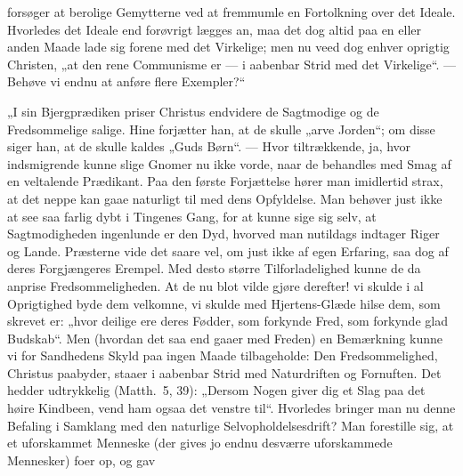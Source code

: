 \documentclass[12pt,a4paper]{book}
\begin{document}
forsøger at berolige Gemytterne ved at fremmumle en Fortolkning over det Ideale. Hvorledes
det Ideale end forøvrigt lægges an, maa det dog altid paa en eller anden Maade lade sig
forene med det Virkelige; men nu veed dog enhver oprigtig Christen, „at den rene
Communisme er --- i aabenbar Strid med det Virkelige“. --- Behøve vi endnu at anføre flere
Exempler?“

„I sin Bjergprædiken priser Christus endvidere de Sagtmodige og de Fredsommelige salige.
Hine forjætter han, at de skulle „arve Jorden“; om disse siger han, at de skulle kaldes
„Guds Børn“. --- Hvor tiltrækkende, ja, hvor indsmigrende kunne slige Gnomer nu ikke vorde,
naar de behandles med Smag af en veltalende Prædikant. Paa den første Forjættelse hører man
imidlertid strax, at det neppe kan gaae naturligt til med dens Opfyldelse. Man behøver just
ikke at see saa farlig dybt i Tingenes Gang, for at kunne sige sig selv, at Sagtmodigheden
ingenlunde er den Dyd, hvorved man nutildags indtager Riger og Lande. Præsterne vide det
saare vel, om just ikke af egen Erfaring, saa dog af deres Forgjængeres
Erempel. Med desto større Tilforladelighed kunne de da anprise Fredsommeligheden. At de nu
blot vilde gjøre derefter! vi skulde i al Oprigtighed byde dem velkomne, vi skulde med
Hjertens-Glæde hilse dem, som skrevet er: „hvor deilige ere deres Fødder, som forkynde
Fred, som forkynde glad Budskab“. Men (hvordan det saa end gaaer med Freden) en Bemærkning
kunne vi for Sandhedens Skyld paa ingen Maade
tilbageholde: Den Fredsommelighed, Christus paabyder, staaer i aabenbar Strid med
Naturdriften og Fornuften. Det hedder udtrykkelig (Matth.\ 5, 39): „Dersom Nogen giver dig
et Slag paa det høire Kindbeen, vend ham ogsaa det venstre til“. Hvorledes bringer man nu
denne Befaling i Samklang med den naturlige Selvopholdelsesdrift? Man forestille sig, at et
uforskammet Menneske (der gives jo endnu desværre uforskammede Mennesker) foer op, og gav
\end{document}
